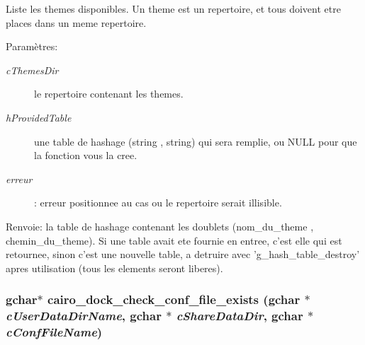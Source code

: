Liste les themes disponibles. Un theme est un repertoire, et tous doivent etre places dans un meme repertoire. \begin{Desc}
\item[Param\`{e}tres:]
\begin{description}
\item[{\em c\-Themes\-Dir}]le repertoire contenant les themes. \item[{\em h\-Provided\-Table}]une table de hashage (string , string) qui sera remplie, ou NULL pour que la fonction vous la cree. \item[{\em erreur}]: erreur positionnee au cas ou le repertoire serait illisible. \end{description}
\end{Desc}
\begin{Desc}
\item[Renvoie:]la table de hashage contenant les doublets (nom\_\-du\_\-theme , chemin\_\-du\_\-theme). Si une table avait ete fournie en entree, c'est elle qui est retournee, sinon c'est une nouvelle table, a detruire avec 'g\_\-hash\_\-table\_\-destroy' apres utilisation (tous les elements seront liberes). \end{Desc}
\subsubsection{\setlength{\rightskip}{0pt plus 5cm}gchar$\ast$ cairo\_\-dock\_\-check\_\-conf\_\-file\_\-exists (gchar $\ast$ {\em c\-User\-Data\-Dir\-Name}, gchar $\ast$ {\em c\-Share\-Data\-Dir}, gchar $\ast$ {\em c\-Conf\-File\-Name})}\label{cairo-dock-applet-factory_8c_55073690cc61234d715457132a54026e}


